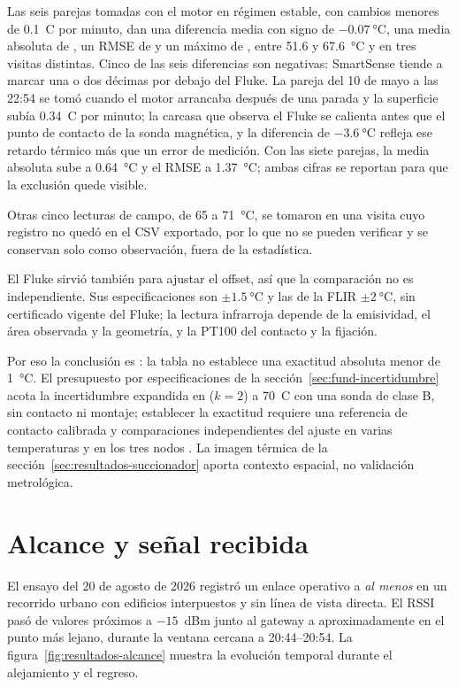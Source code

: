 Las seis parejas tomadas con el motor en régimen estable, con cambios menores de 0.1~\textdegree C por minuto, dan una diferencia media con signo de $-\SI{0.07}{\celsius}$, una media absoluta de \DiferenciaTermicaMedia{}, un RMSE de \RMSETermico{} y un máximo de \DiferenciaTermicaMaxima{}, entre 51.6 y \SI{67.6}{\celsius} y en tres visitas distintas. Cinco de las seis diferencias son negativas: SmartSense tiende a marcar una o dos décimas por debajo del Fluke. La pareja del 10 de mayo a las 22:54 se tomó cuando el motor arrancaba después de una parada y la superficie subía 0.34~\textdegree C por minuto; la carcasa que observa el Fluke se calienta antes que el punto de contacto de la sonda magnética, y la diferencia de $-\SI{3.6}{\celsius}$ refleja ese retardo térmico más que un error de medición. Con las siete parejas, la media absoluta sube a \SI{0.64}{\celsius} y el RMSE a \SI{1.37}{\celsius}; ambas cifras se reportan para que la exclusión quede visible.

Otras cinco lecturas de campo, de 65 a \SI{71}{\celsius}, se tomaron en una visita cuyo registro no quedó en el CSV exportado, por lo que no se pueden verificar y se conservan solo como observación, fuera de la estadística.

El Fluke sirvió también para ajustar el offset, así que la comparación no es independiente. Sus especificaciones son $\pm\SI{1.5}{\celsius}$ y las de la FLIR $\pm\SI{2}{\celsius}$, sin certificado vigente del Fluke; la lectura infrarroja depende de la emisividad, el área observada y la geometría, y la PT100 del contacto y la fijación.

Por eso la conclusión es \EstadoTemperatura{}: la tabla no establece una exactitud absoluta menor de \SI{1}{\celsius}. El presupuesto por especificaciones de la sección~\ref{sec:fund-incertidumbre} acota la incertidumbre expandida en \IncertidumbreTipoB{} ($k=2$) a 70~\textdegree C con una sonda de clase B, sin contacto ni montaje; establecer la exactitud requiere una referencia de contacto calibrada y comparaciones independientes del ajuste en varias temperaturas y en los tres nodos \citep{jcgm2012,jcgm2008}. La imagen térmica de la sección~\ref{sec:resultados-succionador} aporta contexto espacial, no validación metrológica.

\section{Alcance y señal recibida}
\label{sec:resultados-alcance}
El ensayo del 20 de agosto de 2026 registró un enlace operativo a \emph{al menos \DistanciaDemostrada{}} en un recorrido urbano con edificios interpuestos y sin línea de vista directa. El RSSI pasó de valores próximos a $-15$~dBm junto al gateway a aproximadamente \RSSILejano{} en el punto más lejano, durante la ventana cercana a 20:44--20:54. La figura~\ref{fig:resultados-alcance} muestra la evolución temporal durante el alejamiento y el regreso.

